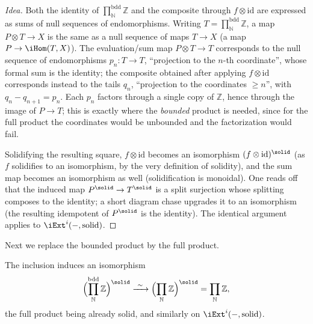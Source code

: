 \begin{proof}[Idea]
Both the identity of $\prod_{\mathbb{N}}^{\mathrm{bdd}}\mathbb{Z}$ and the
composite through $f\otimes\mathrm{id}$ are expressed as sums of null sequences of
endomorphisms. Writing $T=\prod_{\mathbb{N}}^{\mathrm{bdd}}\mathbb{Z}$, a map
$P\otimes T\to X$ is the same as a null sequence of maps $T\to X$ (a map
$P\to\iHom(T,X)$). The evaluation/sum map $P\otimes T\to T$ corresponds to the
null sequence of endomorphisms $p_n\colon T\to T$, ``projection to the $n$-th
coordinate'', whose formal sum is the identity; the composite obtained after
applying $f\otimes\mathrm{id}$ corresponds instead to the tails $q_n$,
``projection to the coordinates $\ge n$'', with $q_n-q_{n+1}=p_n$. Each $p_n$
factors through a single copy of $\mathbb{Z}$, hence through the image of
$P\to T$; this is exactly where the \emph{bounded} product is needed, since for
the full product the coordinates would be unbounded and the factorization would
fail.

Solidifying the resulting square, $f\otimes\mathrm{id}$ becomes an isomorphism
$(f\otimes\mathrm{id})^{\solid}$ (as $f$ solidifies to an isomorphism, by the very
definition of solidity), and the sum map becomes an isomorphism as well
(solidification is monoidal). One reads off that the induced map
$P^{\solid}\to T^{\solid}$ is a split surjection whose splitting composes to the
identity; a short diagram chase upgrades it to an isomorphism (the resulting
idempotent of $P^{\solid}$ is the identity). The identical argument applies to
$\iExt^{i}(-,\text{solid})$.
\end{proof}

Next we replace the bounded product by the full product.

\begin{lemma}
\label{lem:5:bounded-to-full}
The inclusion induces an isomorphism
\begin{equation}
\label{eq:5:bounded-full}
\Bigl(\prod_{\mathbb{N}}^{\mathrm{bdd}}\mathbb{Z}\Bigr)^{\solid}
\xrightarrow{\ \sim\ }\Bigl(\prod_{\mathbb{N}}\mathbb{Z}\Bigr)^{\solid}
=\prod_{\mathbb{N}}\mathbb{Z},
\end{equation}
the full product being already solid, and similarly on $\iExt^{i}(-,\text{solid})$.
\end{lemma}

